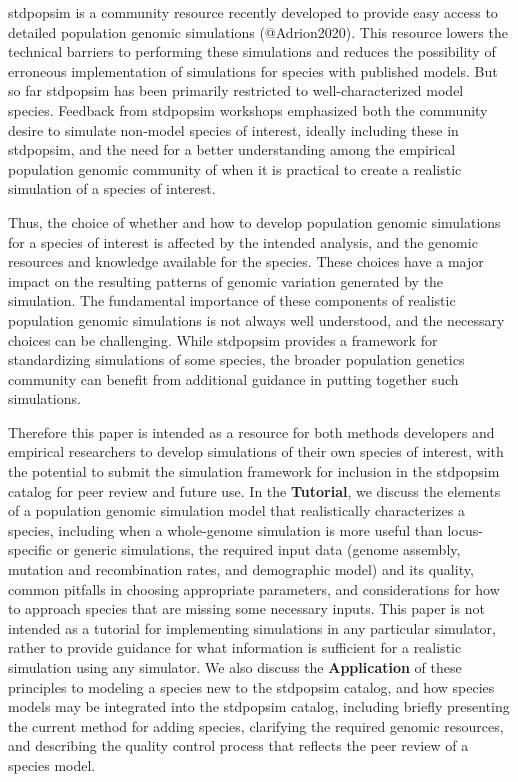 \documentclass[hidelinks]{article}
\begin{document}
stdpopsim is a community resource recently developed to provide easy
access to detailed population genomic simulations (@Adrion2020). This
resource lowers the technical barriers to performing these simulations
and reduces the possibility of erroneous implementation of simulations
for species with published models. But so far stdpopsim has been
primarily restricted to well-characterized model species. Feedback from
stdpopsim workshops emphasized both the community desire to simulate
non-model species of interest, ideally including these in stdpopsim, and
the need for a better understanding among the empirical population
genomic community of when it is practical to create a realistic
simulation of a species of interest.

Thus, the choice of whether and how to develop population genomic
simulations for a species of interest is affected by the intended
analysis, and the genomic resources and knowledge available for the
species. These choices have a major impact on the resulting patterns of
genomic variation generated by the simulation. The fundamental
importance of these components of realistic population genomic
simulations is not always well understood, and the necessary choices can
be challenging. While stdpopsim provides a framework for standardizing
simulations of some species, the broader population genetics community
can benefit from additional guidance in putting together such
simulations.

Therefore this paper is intended as a resource for both methods
developers and empirical researchers to develop simulations of their own
species of interest, with the potential to submit the simulation
framework for inclusion in the stdpopsim catalog for peer review and
future use. In the \textbf{Tutorial}, we discuss the elements of a
population genomic simulation model that realistically characterizes a
species, including when a whole-genome simulation is more useful than
locus-specific or generic simulations, the required input data (genome
assembly, mutation and recombination rates, and demographic model) and
its quality, common pitfalls in choosing appropriate parameters, and
considerations for how to approach species that are missing some
necessary inputs. This paper is not intended as a tutorial for
implementing simulations in any particular simulator, rather to provide
guidance for what information is sufficient for a realistic simulation
using any simulator. We also discuss the \textbf{Application} of these
principles to modeling a species new to the stdpopsim catalog, and how
species models may be integrated into the stdpopsim catalog, including
briefly presenting the current method for adding species, clarifying the
required genomic resources, and describing the quality control process
that reflects the peer review of a species model.
\end{document}
